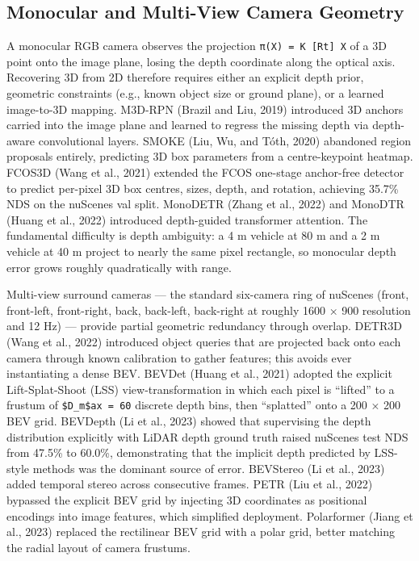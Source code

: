 \subsection{Monocular and Multi-View Camera Geometry}\label{monocular-and-multi-view-camera-geometry}

A monocular RGB camera observes the projection \texttt{π(X)\ =\ K\ {[}R\textbar{}t{]}\ X} of a 3D point onto the image plane, losing the depth coordinate along the optical axis. Recovering 3D from 2D therefore requires either an explicit depth prior, geometric constraints (e.g., known object size or ground plane), or a learned image-to-3D mapping. M3D-RPN (Brazil and Liu, 2019) introduced 3D anchors carried into the image plane and learned to regress the missing depth via depth-aware convolutional layers. SMOKE (Liu, Wu, and Tóth, 2020) abandoned region proposals entirely, predicting 3D box parameters from a centre-keypoint heatmap. FCOS3D (Wang et al., 2021) extended the FCOS one-stage anchor-free detector to predict per-pixel 3D box centres, sizes, depth, and rotation, achieving 35.7\% NDS on the nuScenes val split. MonoDETR (Zhang et al., 2022) and MonoDTR (Huang et al., 2022) introduced depth-guided transformer attention. The fundamental difficulty is depth ambiguity: a 4 m vehicle at 80 m and a 2 m vehicle at 40 m project to nearly the same pixel rectangle, so monocular depth error grows roughly quadratically with range.

Multi-view surround cameras --- the standard six-camera ring of nuScenes (front, front-left, front-right, back, back-left, back-right at roughly 1600 × 900 resolution and 12 Hz) --- provide partial geometric redundancy through overlap. DETR3D (Wang et al., 2022) introduced object queries that are projected back onto each camera through known calibration to gather features; this avoids ever instantiating a dense BEV. BEVDet (Huang et al., 2021) adopted the explicit Lift-Splat-Shoot (LSS) view-transformation in which each pixel is ``lifted'' to a frustum of \texttt{\$D\_m\$ax\ =\ 60} discrete depth bins, then ``splatted'' onto a 200 × 200 BEV grid. BEVDepth (Li et al., 2023) showed that supervising the depth distribution explicitly with LiDAR depth ground truth raised nuScenes test NDS from 47.5\% to 60.0\%, demonstrating that the implicit depth predicted by LSS-style methods was the dominant source of error. BEVStereo (Li et al., 2023) added temporal stereo across consecutive frames. PETR (Liu et al., 2022) bypassed the explicit BEV grid by injecting 3D coordinates as positional encodings into image features, which simplified deployment. Polarformer (Jiang et al., 2023) replaced the rectilinear BEV grid with a polar grid, better matching the radial layout of camera frustums.

